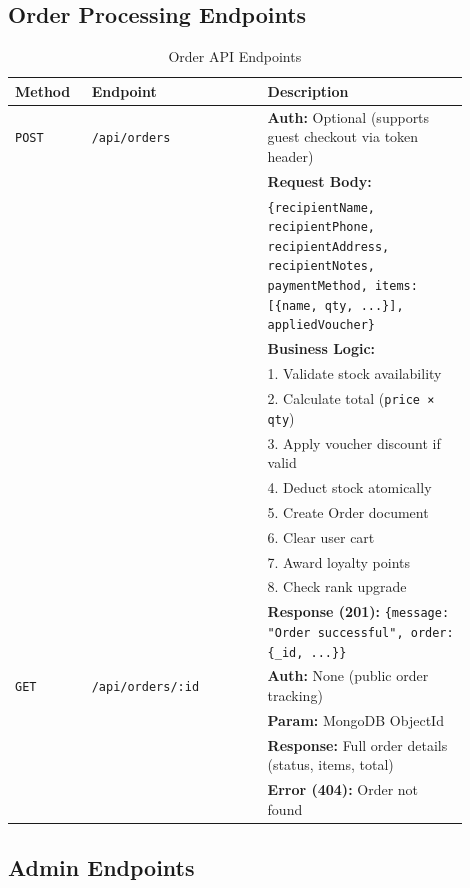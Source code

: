 \subsection{Order Processing Endpoints}

\begin{table}[H]
\centering
\caption{Order API Endpoints}
\label{tab:api_orders}
\small
\begin{tabular}{@{}p{0.15\linewidth}p{0.35\linewidth}p{0.40\linewidth}@{}}
\toprule
\textbf{Method} & \textbf{Endpoint} & \textbf{Description} \\
\midrule
\texttt{POST} & \texttt{/api/orders} & 
\textbf{Auth:} Optional (supports guest checkout via token header) \\
& & \textbf{Request Body:} \\
& & \texttt{\{recipientName, recipientPhone, recipientAddress, recipientNotes, paymentMethod, items: [\{name, qty, ...\}], appliedVoucher\}} \\
& & \textbf{Business Logic:} \\
& & 1. Validate stock availability \\
& & 2. Calculate total (\texttt{price × qty}) \\
& & 3. Apply voucher discount if valid \\
& & 4. Deduct stock atomically \\
& & 5. Create Order document \\
& & 6. Clear user cart \\
& & 7. Award loyalty points \\
& & 8. Check rank upgrade \\
& & \textbf{Response (201):} \texttt{\{message: "Order successful", order: \{\_id, ...\}\}} \\
\midrule
\texttt{GET} & \texttt{/api/orders/:id} & 
\textbf{Auth:} None (public order tracking) \\
& & \textbf{Param:} MongoDB ObjectId \\
& & \textbf{Response:} Full order details (status, items, total) \\
& & \textbf{Error (404):} Order not found \\
\bottomrule
\end{tabular}
\end{table}

\subsection{Admin Endpoints}

